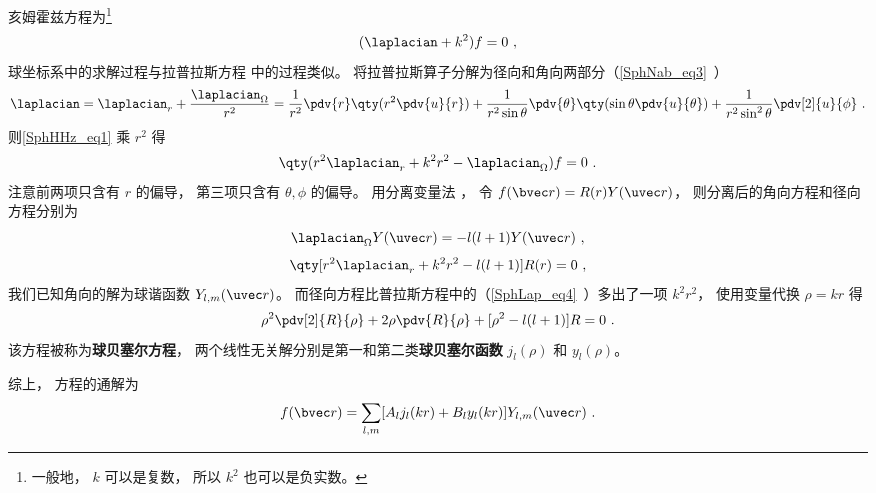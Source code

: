 

亥姆霍兹方程为\footnote{一般地， $k$ 可以是复数， 所以 $k^2$ 也可以是负实数。}
\begin{equation}\label{SphHHz_eq1}
(\laplacian + k^2)f = 0~,
\end{equation}
球坐标系中的求解过程与拉普拉斯方程 中的过程类似。 将拉普拉斯算子分解为径向和角向两部分（\autoref{SphNab_eq3}~）
\begin{equation}
\laplacian = \laplacian_r + \frac{\laplacian_{\Omega}}{r^2} = \frac{1}{r^2} \pdv{r} \qty(r^2 \pdv{u}{r}) + \frac{1}{r^2\sin\theta}\pdv{\theta} \qty(\sin \theta \pdv{u}{\theta}) + \frac{1}{r^2\sin^2 \theta} \pdv[2]{u}{\phi}~.
\end{equation}
则\autoref{SphHHz_eq1} 乘 $r^2$ 得
\begin{equation}
\qty(r^2\laplacian_r + k^2 r^2 - \laplacian_\Omega) f = 0~.
\end{equation}
注意前两项只含有 $r$ 的偏导， 第三项只含有 $\theta,\phi$ 的偏导。 用分离变量法 %
， 令 $f(\bvec r) = R(r) Y(\uvec r)$， 则分离后的角向方程和径向方程分别为
\begin{equation}
\laplacian_{\Omega} Y(\uvec r) = -l(l+1) Y(\uvec r)~,
\end{equation}
\begin{equation}
\qty[r^2\laplacian_r + k^2 r^2 - l(l+1)] R(r) = 0~,
\end{equation}
我们已知角向的解为球谐函数 $Y_{l,m}(\uvec r)$。 而径向方程比普拉斯方程中的（\autoref{SphLap_eq4}~）多出了一项 $k^2r^2$， 使用变量代换 $\rho = kr$ 得
\begin{equation}
\rho^2\pdv[2]{R}{\rho} + 2\rho\pdv{R}{\rho} + [\rho^2 - l(l+1)] R = 0~.
\end{equation}
该方程被称为\textbf{球贝塞尔方程}， 两个线性无关解分别是第一和第二类\textbf{球贝塞尔函数} $j_l(\rho)$ 和 $y_l(\rho)$。

综上， 方程的通解为
\begin{equation}
f(\bvec r) = \sum_{l,m} [A_l j_l(kr) + B_l y_l(kr)] Y_{l,m}(\uvec r)~.
\end{equation}
